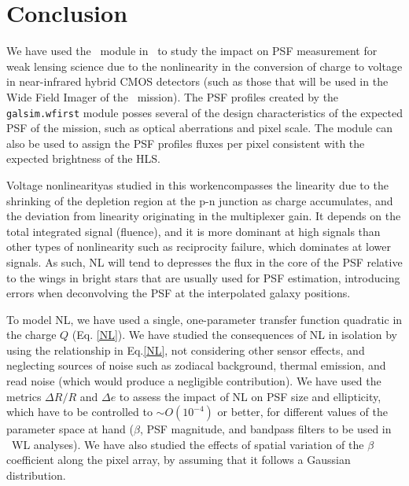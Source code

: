 \documentclass[preprint]{aastex}
\begin{document}
\section{Conclusion}
\label{Conclusion}
We have used the \wfa\ module in \gs\ to study the impact on PSF measurement for weak lensing science due to the nonlinearity in the conversion of charge to voltage in near-infrared hybrid CMOS detectors (such as those that will be used in the Wide Field Imager of the \wfa\ mission). The PSF profiles created by the {\tt{galsim.wfirst}} module posses several of the design characteristics of the expected PSF of the mission, such as optical aberrations and pixel scale. The module can also be used to assign the PSF profiles fluxes per pixel consistent with the expected brightness of the HLS. 

Voltage nonlinearity\textemdash as studied in this work\textemdash encompasses the linearity due to the shrinking of the depletion region at the p-n junction as charge accumulates, and the deviation from linearity originating in the multiplexer gain. It depends on the total integrated signal (fluence), and it is more dominant at high signals than other types of nonlinearity such as reciprocity failure, which dominates at lower signals. As such, NL will tend to depresses the flux in the core of the PSF relative to the wings in bright stars that are usually used for PSF estimation, introducing errors when deconvolving the PSF at the interpolated galaxy positions.

To model NL, we have used a single, one-parameter transfer function quadratic in the charge $Q$ (Eq. \ref{NL}). We have studied the consequences of NL in isolation by using the relationship in Eq.\ref{NL}, not considering other sensor effects, and neglecting sources of noise such as zodiacal background, thermal emission, and read noise (which would produce a negligible contribution). We have used the metrics $\Delta R/R$ and $\Delta e$ to assess the impact of NL on PSF size and ellipticity, which have to be controlled to $\sim O(10^{-4})$ or better, for different values of the parameter space at hand ($\beta$, PSF magnitude, and bandpass filters to be used in \wfa\ WL analyses).  We have also studied the effects of spatial variation of the $\beta$ coefficient along the pixel array, by assuming that it follows a Gaussian distribution. 
\end{document}
